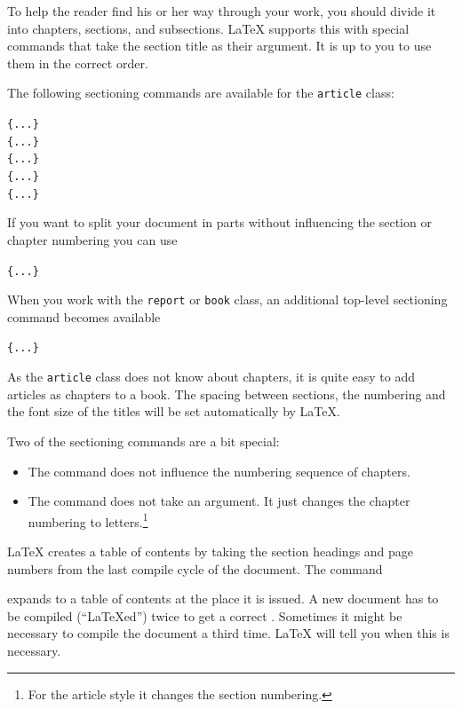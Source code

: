 To help the reader find his or her way through your work, you should
divide it into chapters, sections, and subsections.  \LaTeX{} supports
this with special commands that take the section title as their
argument.  It is up to you to use them in the correct order.

The following sectioning commands are available for the
\texttt{article} class: \nopagebreak

\begin{lscommand}
\verb|{...}|\\
\verb|{...}|\\
\verb|{...}|\\
\verb|{...}|\\
\verb|{...}|
\end{lscommand}

If you want to split your document in parts without influencing the
section or chapter numbering you can use
\begin{lscommand}
\verb|{...}|
\end{lscommand}

When you work with the \texttt{report} or \texttt{book} class,
an additional top-level sectioning command becomes available
\begin{lscommand}
\verb|{...}|
\end{lscommand}

As the \texttt{article} class does not know about chapters, it is quite easy
to add articles as chapters to a book.
The spacing between sections, the numbering and the font size of the
titles will be set automatically by \LaTeX. 

Two of the sectioning commands are a bit special: 
\begin{itemize}
\item The  command does
  not influence the numbering sequence of chapters.  
\item The  command does not take an argument. It just
  changes the chapter numbering to letters.\footnote{For the article
    style it changes the section numbering.}
\end{itemize}



\LaTeX{} creates a table of contents by taking the section headings
and page numbers from the last compile cycle of the document. The command 
\begin{lscommand} 
\end{lscommand} 
\noindent expands to a table of contents at the place it
is issued. A new
document has to be compiled (``\LaTeX ed'') twice to get a
correct . Sometimes it might be
necessary to compile the document a third time. \LaTeX{} will tell you
when this is necessary.

